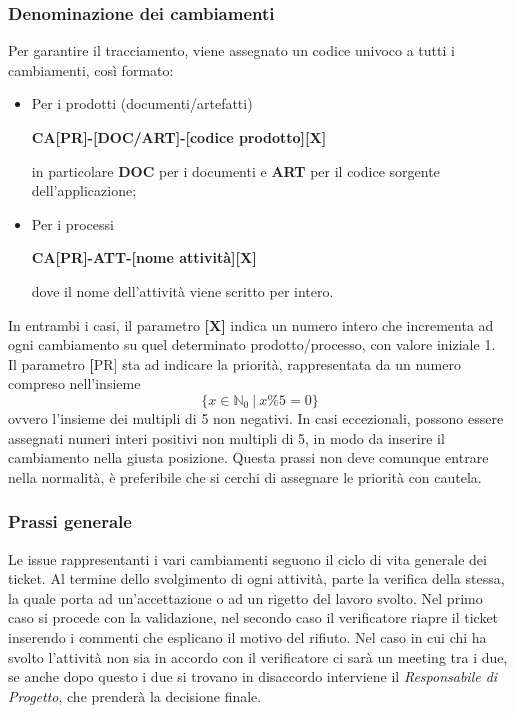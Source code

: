 \subsubsection{Denominazione dei cambiamenti}
Per garantire il tracciamento, viene assegnato un codice univoco a tutti i cambiamenti, così formato:
\begin{itemize}
    \item Per i prodotti (documenti/artefatti)
        \begin{center}
            \textbf{CA[PR]-[DOC/ART]-[codice prodotto][X]}
        \end{center}
        in particolare \textbf{DOC} per i documenti e \textbf{ART} per il codice sorgente dell'applicazione;
    \item Per i processi
        \begin{center}
            \textbf{CA[PR]-ATT-[nome attività][X]}
        \end{center}
        dove il nome dell'attività viene scritto per intero.
\end{itemize}
In entrambi i casi, il parametro \textbf{[X]} indica un numero intero che incrementa ad ogni cambiamento su quel determinato prodotto/processo,
 con valore iniziale 1.\\
 Il parametro \textbf[PR] sta ad indicare la priorità, rappresentata da un numero compreso nell'insieme
 \[\{x \in \mathbb{N}_0 \ | \  x \% 5 = 0 \} \]
 ovvero l'insieme dei multipli di 5 non negativi. In casi eccezionali, possono essere assegnati numeri interi positivi non multipli di 5,
 in modo da inserire il cambiamento nella giusta posizione. Questa prassi non deve comunque entrare nella normalità,  è preferibile che si cerchi
 di assegnare le priorità con cautela.

 \subsubsection{Prassi generale}
 Le issue rappresentanti i vari cambiamenti seguono il ciclo di vita generale dei ticket.
 Al termine dello svolgimento di ogni attività,  parte la verifica della stessa,  la quale porta ad un'accettazione o ad un rigetto
del lavoro svolto.  Nel primo caso si procede con la validazione, nel secondo caso il verificatore riapre il ticket inserendo i commenti
che esplicano il motivo del rifiuto. Nel caso in cui chi ha svolto l'attività non sia in accordo con il verificatore ci sarà un meeting tra i due, se anche
dopo questo i due si trovano in disaccordo interviene il \textit{Responsabile di Progetto}, che prenderà la decisione finale.

